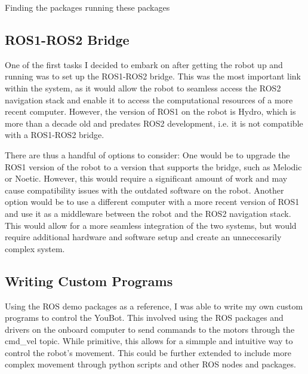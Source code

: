 \documentclass[a4paper, 12pt]{article}
\newif\ifshownotes
\newcommand{\notes}[1]{\ifshownotes\textcolor{blue}{#1}\fi}
\begin{document}
    \notes{
        so what packages were there?
    }

    \notes{describe the process of inspecting the installed software, the drivers and wrappers, and running the original demos.}
     \notes{rqt, rviz, writing own packages, catkin, the various topics and nodes, etc. }
    Finding the packages
    running these packages

    \pagebreak

    \pagebreak
    \subsection{ROS1-ROS2 Bridge}

    One of the first tasks I decided to embark on after getting the robot up and running was to set up the ROS1-ROS2 bridge. This was the most important link within the system, as it would allow the robot to seamless access the ROS2 navigation stack and enable it to access the computational resources of a more recent computer. However, the version of ROS1 on the robot is Hydro, which is more than a decade old and predates ROS2 development, i.e. it is not compatible with a ROS1-ROS2 bridge. 

    There are thus a handful of options to consider: One would be to upgrade the ROS1 version of the robot to a version that supports the bridge, such as Melodic or Noetic. However, this would require a significant amount of work and may cause compatibility issues with the outdated software on the robot. Another option would be to use a different computer with a more recent version of ROS1 and use it as a middleware between the robot and the ROS2 navigation stack. This would allow for a more seamless integration of the two systems, but would require additional hardware and software setup and create an unneccesarily complex system. 

    \pagebreak

    \subsection{Writing Custom Programs}

    Using the ROS demo packages as a reference, I was able to write my own custom programs to control the YouBot. This involved using the ROS packages and drivers on the onboard computer to send commands to the motors through the \/cmd\_vel topic. While primitive, this allows for a simmple and intuitive way to control the robot's movement. This could be further extended to include more complex movement through python scripts and other ROS nodes and packages.
\end{document}
